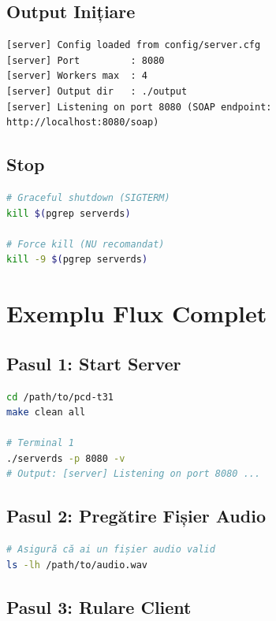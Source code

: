 \documentclass[12pt,a4paper,oneside]{book}
\begin{document}
\subsection{Output Inițiare}

\begin{lstlisting}
[server] Config loaded from config/server.cfg
[server] Port         : 8080
[server] Workers max  : 4
[server] Output dir   : ./output
[server] Listening on port 8080 (SOAP endpoint: http://localhost:8080/soap)
\end{lstlisting}

\subsection{Stop}

\begin{lstlisting}[language=bash]
# Graceful shutdown (SIGTERM)
kill $(pgrep serverds)

# Force kill (NU recomandat)
kill -9 $(pgrep serverds)
\end{lstlisting}

\section{Exemplu Flux Complet}

\subsection{Pasul 1: Start Server}

\begin{lstlisting}[language=bash]
cd /path/to/pcd-t31
make clean all

# Terminal 1
./serverds -p 8080 -v
# Output: [server] Listening on port 8080 ...
\end{lstlisting}

\subsection{Pasul 2: Pregătire Fișier Audio}

\begin{lstlisting}[language=bash]
# Asigură că ai un fișier audio valid
ls -lh /path/to/audio.wav
\end{lstlisting}

\subsection{Pasul 3: Rulare Client}
\end{document}
